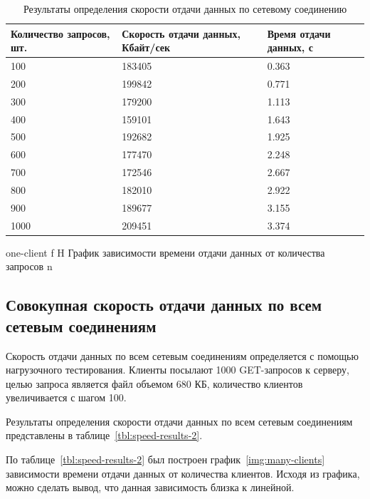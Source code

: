 \begin{table}[H]
	\centering
	\caption{Результаты определения скорости отдачи данных по сетевому соединению}
	\label{tbl:speed-results-1}
	\begin{tabularx}{\textwidth}{|X|X|X|}
		\hline
		\textbf{Количество запросов, шт.} & \textbf{Скорость отдачи данных, Кбайт/сек} & \textbf{Время отдачи данных, с} \\
		\hline
		100 & 183405 & 0.363 \\
		\hline
		200 & 199842 & 0.771 \\
		\hline
		300 & 179200 & 1.113 \\
		\hline 
		400 & 159101 & 1.643 \\
		\hline 
		500 & 192682 & 1.925 \\
		\hline 
		600 & 177470 & 2.248 \\
		\hline 
		700 & 172546 & 2.667 \\ 
		\hline
		800 & 182010 & 2.922 \\
		\hline 
		900 & 189677 & 3.155 \\
		\hline 
		1000 & 209451 & 3.374 \\
		\hline
	\end{tabularx}
\end{table}

{one-client}
{f} %
{H}
{\textwidth} %
{График зависимости времени отдачи данных от количества запросов}
{n}

\subsection{Совокупная скорость отдачи данных по всем сетевым соединениям}

Скорость отдачи данных по всем сетевым соединениям определяется с помощью нагрузочного тестирования. Клиенты посылают 1000 GET-запросов к серверу, целью запроса является файл объемом 680 КБ, количество клиентов увеличивается с шагом 100.

Результаты определения скорости отдачи данных по всем сетевым соединениям представлены в таблице~\ref{tbl:speed-results-2}.

По таблице~\ref{tbl:speed-results-2} был построен график~\ref{img:many-clients} зависимости времени отдачи данных от количества клиентов. Исходя из графика, можно сделать вывод, что данная зависимость близка к линейной.

